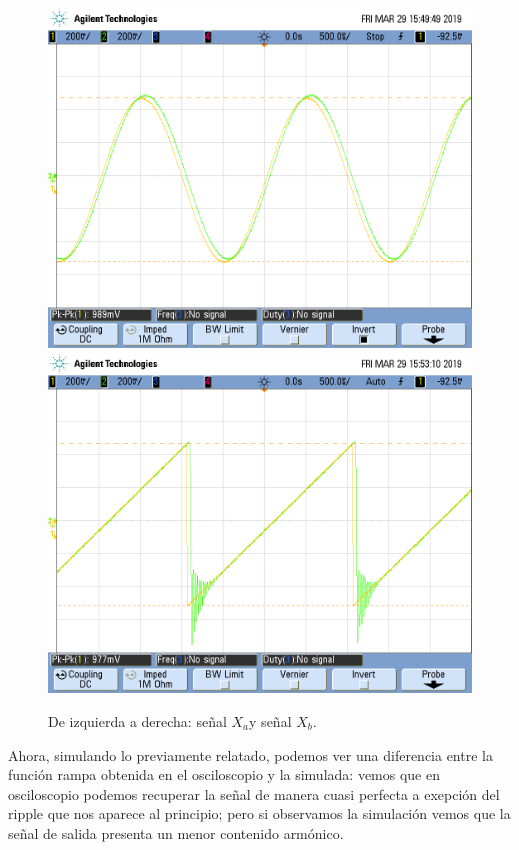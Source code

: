 \documentclass[../../ASSD_TP1_G7.tex]{subfiles}
\begin{document}
\begin{figure}[H]

\begin{centering}
\includegraphics[scale=0.25]{Imagenes/syh_pto_bsin}\includegraphics[scale=0.25]{Imagenes/syh_pto_bcuad_1}\caption{De izquierda a derecha: señal $X_{a}$y señal $X_{b}$.}
\par\end{centering}
\end{figure}

Ahora, simulando lo previamente relatado, podemos ver una diferencia
entre la función rampa obtenida en el osciloscopio y la simulada:
vemos que en osciloscopio podemos recuperar la señal de manera cuasi
perfecta a exepción del ripple que nos aparece al principio; pero
si observamos la simulación vemos que la señal de salida presenta
un menor contenido armónico.
\end{document}
